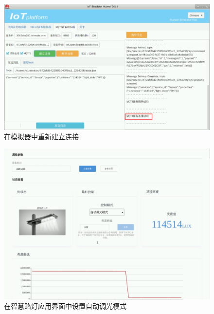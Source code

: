 \begin{figure}[!htbp]
\centering
\includegraphics[width=\textwidth]{figures/序列 01.00_24_40_49.Still023.png}
\caption{在模拟器中重新建立连接}\label{在模拟器中重新建立连接}
\end{figure}

\begin{figure}[!htbp]
\centering
\includegraphics[width=\textwidth]{figures/序列 01.00_25_02_59.Still024.png}
\caption{在智慧路灯应用界面中设置自动调光模式}\label{在智慧路灯应用界面中设置自动调光模式}
\end{figure}

